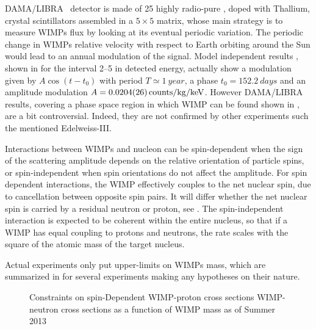 DAMA/LIBRA~\cite{damalibra} detector is made of 25 highly radio-pure , doped with Thallium, crystal scintillators assembled in a $5\times5$ matrix, whose main strategy is to measure WIMPs flux by looking at its eventual periodic variation. The periodic change in WIMPs relative velocity with respect to Earth orbiting around the Sun would lead to an annual modulation of the signal. Model independent results
, shown in \Fig{\ref{fig:damalibra}} for the interval \SIrange{2}{5}{\kev} in detected energy, actually show a modulation given by $A\cos{(t-t_0)}$ with period $T\simeq \SI{1}{year}$, a phase $t_0=\SI{152.2}{days}$ and an amplitude modulation $A =\SI{0.0204\pm0.0026}{counts/\kg/\keV}$. However DAMA/LIBRA results, covering a phase space region in which WIMP can be found shown in \Fig{\ref{fig:WIMPcs}}, are a bit controversial. Indeed, they are not confirmed by other experiments such the mentioned Edelweiss-III.

Interactions between WIMPs and nucleon can be spin-dependent when the sign of the scattering amplitude depends on the relative orientation of particle spins, or spin-independent when spin orientations do not affect the amplitude. For spin dependent interactions, the WIMP effectively couples to the net nuclear spin, due to cancellation between opposite spin pairs. It will differ whether the net nuclear spin is carried by a residual neutron or proton, see \Fig{\ref{fig:WIMPcsSD}}. The spin-independent interaction is expected to be coherent within the entire nucleus, so that if a WIMP has equal coupling to protons and neutrons, the rate scales with the square of the atomic mass of the target nucleus. 

Actual experiments only put upper-limits on WIMPs mass, which are summarized in \Fig{\ref{fig:WIMPcs}} for several experiments making any hypotheses on their nature.

\begin{figure}[p]
\centering
{}\quad
{}

\caption{Constraints on spin-Dependent WIMP-proton cross sections WIMP-neutron cross sections  as a function of WIMP
mass as of Summer 2013}
\label{fig:WIMPcsSD}
\end{figure}

